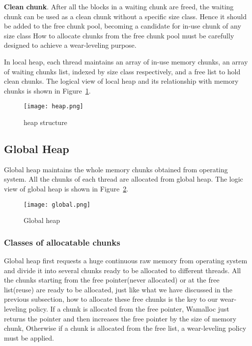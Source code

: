 \documentclass[10pt, conference, compsocconf]{IEEEtran}
\begin{document}
\textbf{Clean chunk}.
After all the blocks in a waiting chunk are freed, 
the waiting chunk can be used as a clean chunk without a specific size class.
Hence it should be added to the free chunk pool, becoming a candidate for in-use chunk of any size class
How to allocate chunks from the free chunk pool must be carefully designed to achieve a wear-leveling purpose.


In local heap,
each thread maintains an array of in-use memory chunks, 
an array of waiting chunks list, indexed by size class respectively, 
and a free list to hold clean chunks.
The logical view of local heap and its relationship with memory chunks is shown in Figure~\ref{fig:heap}.

\begin{figure}[h]
\centering
\texttt{[image: heap.png]}
\caption{heap structure}
\label{fig:heap}
\end{figure}

\subsection{Global Heap}

Global heap maintains the whole memory chunks obtained from operating system. 
All the chunks of each thread are allocated from global heap. 
The logic view of global heap is shown in Figure~\ref{fig:global}.

\begin{figure}[h]
\centering
\texttt{[image: global.png]}
\caption{Global heap }
\label{fig:global}
\end{figure}

\subsubsection{Classes of allocatable chunks}
Global heap first requests a huge continuous raw memory from operating system
and divide it into several chunks ready to be allocated to different threads.
All the chunks starting from the free pointer(never allocated) or at the free list(reuse) are ready to be allocated, 
just like what we have discussed in the previous subsection,
how to allocate these free chunks is the key to our wear-leveling policy.
If a chunk is allocated from the free pointer, 
Wamalloc just returns the pointer and then increases the free pointer by the size of memory chunk, 
Otherwise if a chunk is allocated from the free list, a wear-leveling policy must be applied.
\end{document}
